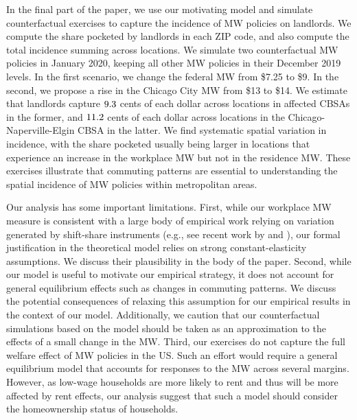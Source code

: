 In the final part of the paper, we use our motivating model and simulate 
counterfactual exercises to capture the incidence of MW policies on landlords.
We compute the share pocketed by landlords in each ZIP code, and also
compute the total incidence summing across locations.
We simulate two counterfactual MW policies in January 2020, keeping all other
MW policies in their December 2019 levels.
In the first scenario, we change the federal MW from \$7.25 to \$9.
In the second, we propose a rise in the Chicago City MW from \$13 to \$14.
We estimate that landlords capture $\textnormal{9.3}$ cents of each 
dollar across locations in affected CBSAs in the former, and 
$\textnormal{11.2}$ cents of each dollar across locations in the 
Chicago-Naperville-Elgin CBSA in the latter.
We find systematic spatial variation in incidence,
with the share pocketed usually being larger in locations that experience an
increase in the workplace MW but not in the residence MW.
These exercises illustrate that commuting patterns are essential to 
understanding the spatial incidence of MW policies within metropolitan areas.


Our analysis has some important limitations.
First, while our workplace MW measure is consistent with a large body of 
empirical work relying on variation generated by shift-share instruments 
(e.g., see recent work by \cite{GoldsmithpinkhamEtAl2020} and
\cite{BorusyakHullJaravel2021}), our formal justification in the theoretical 
model relies on strong constant-elasticity assumptions.
We discuss their plausibility in the body of the paper.
Second, while our model is useful to motivate our empirical strategy, it does 
not account for general equilibrium effects such as changes in commuting 
patterns.
We discuss the potential consequences of relaxing this assumption for our 
empirical results in the context of our model.
Additionally, we caution that our counterfactual simulations based on the model 
should be taken as an approximation to the effects of a small change in the MW.
Third, our exercises do not capture the full welfare effect of MW policies
in the US.
Such an effort would require a general equilibrium model that accounts for 
responses to the MW across several margins.
However, as low-wage households are more likely to rent and thus will be more 
affected by rent effects, our analysis suggest that such a model should 
consider the homeownership status of households.


